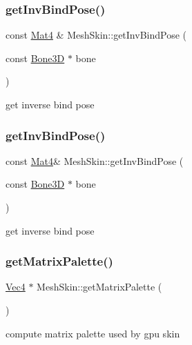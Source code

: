 \subsubsection{\texorpdfstring{get\+Inv\+Bind\+Pose()}{getInvBindPose()}\hspace{0.1cm}{\footnotesize\ttfamily [1/2]}}
{\footnotesize\ttfamily const \hyperlink{classMat4}{Mat4} \& Mesh\+Skin\+::get\+Inv\+Bind\+Pose (\begin{DoxyParamCaption}\item[{const \hyperlink{classBone3D}{Bone3D} $\ast$}]{bone }\end{DoxyParamCaption})}

get inverse bind pose \mbox{\label{classMeshSkin_a9d8ba78b228c94ba4a4e62ff80818164}} 
\subsubsection{\texorpdfstring{get\+Inv\+Bind\+Pose()}{getInvBindPose()}\hspace{0.1cm}{\footnotesize\ttfamily [2/2]}}
{\footnotesize\ttfamily const \hyperlink{classMat4}{Mat4}\& Mesh\+Skin\+::get\+Inv\+Bind\+Pose (\begin{DoxyParamCaption}\item[{const \hyperlink{classBone3D}{Bone3D} $\ast$}]{bone }\end{DoxyParamCaption})}

get inverse bind pose \mbox{\label{classMeshSkin_a7b69c95bc99166c91cd20b8aa24f1ac2}} 
\subsubsection{\texorpdfstring{get\+Matrix\+Palette()}{getMatrixPalette()}\hspace{0.1cm}{\footnotesize\ttfamily [1/2]}}
{\footnotesize\ttfamily \hyperlink{classVec4}{Vec4} $\ast$ Mesh\+Skin\+::get\+Matrix\+Palette (\begin{DoxyParamCaption}{ }\end{DoxyParamCaption})}

compute matrix palette used by gpu skin \mbox{\label{classMeshSkin_a69c550cdf8ed656c6faaa4ad912ddad6}} 
